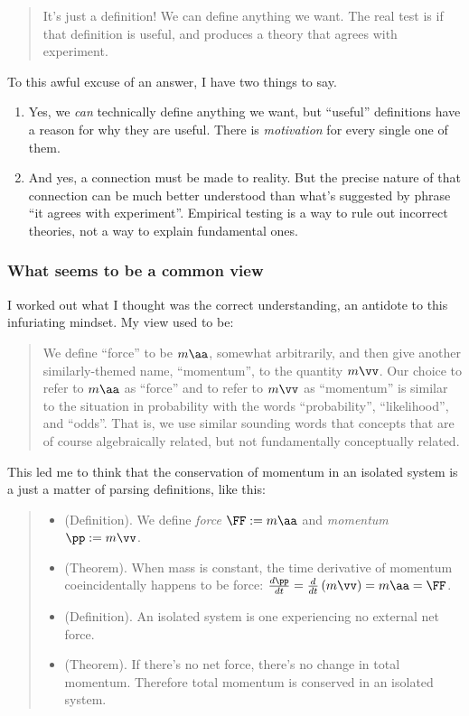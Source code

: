 \documentclass{article}
\begin{document}
\begin{quote}
    It’s just a definition! We can define anything we want. The real test is if that definition is useful, and produces a theory that agrees with experiment.
\end{quote}

To this awful excuse of an answer, I have two things to say.

\begin{enumerate}
    \item Yes, we \textit{can} technically define anything we want, but ``useful'' definitions have a reason for why they are useful. There is \textit{motivation} for every single one of them.
    \item And yes, a connection must be made to reality. But the precise nature of that connection can be much better understood than what's suggested by phrase ``it agrees with experiment''. Empirical testing is a way to rule out incorrect theories, not a way to explain fundamental ones.
\end{enumerate}

\subsubsection*{What seems to be a common view}

I worked out what I thought was the correct understanding, an antidote to this infuriating mindset. My view used to be: 

\begin{quote}
   We define ``force'' to be $m \aa$, somewhat arbitrarily, and then give another similarly-themed name, ``momentum'', to the quantity $m \vv$. Our choice to refer to $m\aa$ as ``force'' and to refer to $m\vv$ as ``momentum'' is similar to the situation in probability with the words ``probability'', ``likelihood'', and ``odds''. That is, we use similar sounding words that concepts that are of course algebraically related, but not fundamentally conceptually related.
\end{quote}

This led me to think that the conservation of momentum in an isolated system is a just a matter of parsing definitions, like this:

\begin{quote}
    \begin{itemize}
        \item (Definition). We define \textit{force} $\FF := m \aa$ and \textit{momentum} $\pp := m \vv$.
        \item (Theorem). When mass is constant, the time derivative of momentum coeincidentally happens to be force: $\frac{d\pp}{dt} = \frac{d}{dt}\left(m\vv\right) = m\aa = \FF$.
        \item (Definition). An isolated system is one experiencing no external net force.
        \item (Theorem). If there's no net force, there's no change in total momentum. Therefore total momentum is conserved in an isolated system.
    \end{itemize}
\end{quote}
\end{document}
